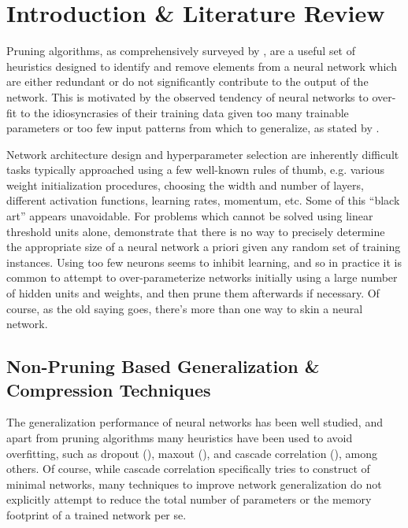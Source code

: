 \section{Introduction \& Literature Review}\label{sec1}

Pruning algorithms, as comprehensively surveyed by \cite{reed1993pruning}, are a useful set of heuristics designed to identify and remove elements from a neural network which are either redundant or do not significantly contribute to the output of the network. This is motivated by the observed tendency of neural networks to over-fit to the idiosyncrasies of their training data given too many trainable parameters or too few input patterns from which to generalize, as stated by \cite{chauvin1990generalization}. 

Network architecture design and hyperparameter selection are inherently difficult tasks typically approached using a few well-known rules of thumb, e.g. various weight initialization procedures, choosing the width and number of layers, different activation functions, learning rates, momentum, etc. Some of this ``black art'' appears unavoidable. For problems which cannot be solved using linear threshold units alone, \cite{baum1989size} demonstrate that there is no way to precisely determine the appropriate size of a neural network a priori given any random set of training instances. Using too few neurons seems to inhibit learning, and so in practice it is common to attempt to over-parameterize networks initially using a large number of hidden units and weights, and then prune them afterwards if necessary. Of course, as the old saying goes, there's more than one way to skin a neural network. 

\subsection{Non-Pruning Based Generalization \& Compression Techniques}

The generalization performance of neural networks has been well studied, and apart from pruning algorithms many heuristics have been used to avoid overfitting, such as dropout (\cite{srivastava2014dropout}), maxout (\cite{goodfellow2013maxout}), and cascade correlation (\cite{fahlman1989cascade}), among others. Of course, while cascade correlation specifically tries to construct of minimal networks, many techniques to improve network generalization do not explicitly attempt to reduce the total number of parameters or the memory footprint of a trained network per se.  

